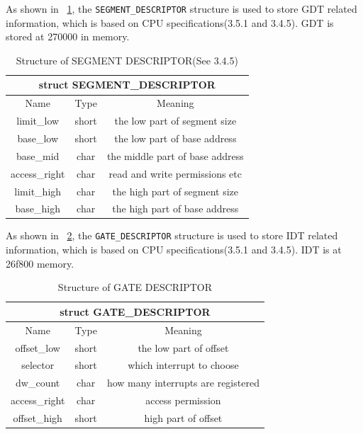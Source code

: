\documentclass{swfcthesis}
\begin{document}
As shown in ~\ref{tab:SEGMENT-DESCRIPTOR}, the \texttt{SEGMENT\_DESCRIPTOR} structure is
used to store GDT related information, which is based on CPU specifications(3.5.1 and
3.4.5\cite{intel_3a}). GDT is stored at 270000 in memory.

\begin{table}[!htbp]
  \centering
  \begin{tabular}[c]{|c|c|c|}
    \hline
    \multicolumn{3}{|c|}{struct SEGMENT\_DESCRIPTOR} \\
    \hline
    Name & Type & Meaning \\
    \hline
    limit\_low & short & the low part of segment size \\
    \hline
    base\_low & short & the low part of base address \\
    \hline
    base\_mid & char & the middle part of base address \\
    \hline
    access\_right & char & read and write permissions etc \\
    \hline
    limit\_high & char & the high part of segment size \\
    \hline
    base\_high & char & the high part of base address \\
    \hline
  \end{tabular}
  \caption{Structure of SEGMENT DESCRIPTOR(See 3.4.5\cite{intel_3a})}
  \label{tab:SEGMENT-DESCRIPTOR}
\end{table}

As shown in ~\ref{tab:GATE-DESCRIPTOR}, the \texttt{GATE\_DESCRIPTOR} structure is used to
store IDT related information, which is based on CPU specifications(3.5.1 and
3.4.5\cite{intel_3a}). IDT is at 26f800 memory.
\begin{table}[!htbp]
  \centering
  \begin{tabular}[c]{|c|c|c|}
    \hline
    \multicolumn{3}{|c|}{struct GATE\_DESCRIPTOR} \\
    \hline
    Name & Type & Meaning \\
    \hline
    offset\_low & short & the low part of offset \\
    \hline
    selector & short & which interrupt to choose \\
    \hline
    dw\_count & char & how many interrupts are registered \\
    \hline
    access\_right & char & access permission \\
    \hline
    offset\_high & short & high part of offset \\
    \hline
    
  \end{tabular}
  \caption{Structure of GATE DESCRIPTOR}
  \label{tab:GATE-DESCRIPTOR}
\end{table}
\end{document}
